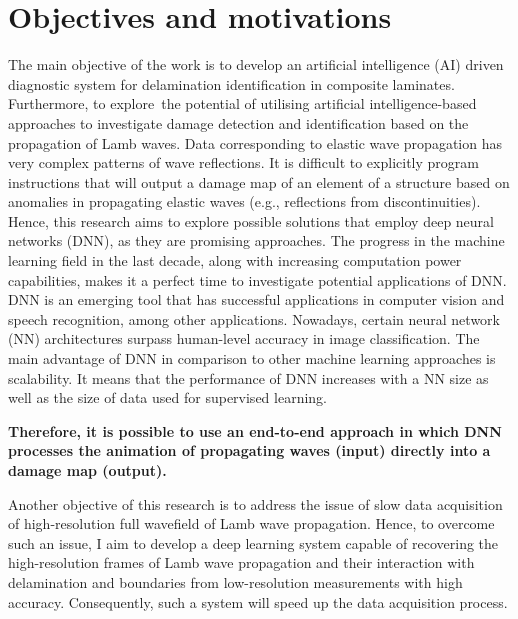 \section{Objectives and motivations}
\label{sec13}

The main objective of the work is to develop an artificial intelligence (AI) driven diagnostic system for delamination identification in composite laminates.
Furthermore, to explore the potential of utilising artificial intelligence-based approaches to investigate damage detection and identification based on the propagation of Lamb waves.
Data corresponding to elastic wave propagation has very complex patterns of wave reflections. 
It is difficult to explicitly program instructions that will output a damage map of an element of a structure based on anomalies in propagating elastic waves (e.g., reflections from discontinuities).
Hence, this research aims to explore possible solutions that employ deep neural networks (DNN), as they are promising approaches.
The progress in the machine learning field in the last decade, along with increasing computation power capabilities, makes it a perfect time to investigate potential applica\-tions of DNN. 
DNN is an emerging tool that has successful applications in computer vision and speech recognition, among other applications. 
Nowadays, certain neural network (NN) architectures surpass human-level accuracy in image classification. 
The main advantage of DNN in comparison to other machine learning approaches is scalability. 
It means that the performance of DNN increases with a NN size as well as the size of data used for supervised learning. 

\textbf{Therefore, it is possible to use an end-to-end approach in which DNN processes the animation of propagating waves (input) directly into a damage map (output).}

Another objective of this research is to address the issue of slow data acquisition of high-resolution full wavefield of Lamb wave propagation.
Hence, to overcome such an issue, I aim to develop a deep learning system capable of recovering the high-resolution frames of Lamb wave propagation and their interaction with delamination and boundaries from low-resolution measurements with high accuracy.
Consequently, such a system will speed up the data acquisition process.


